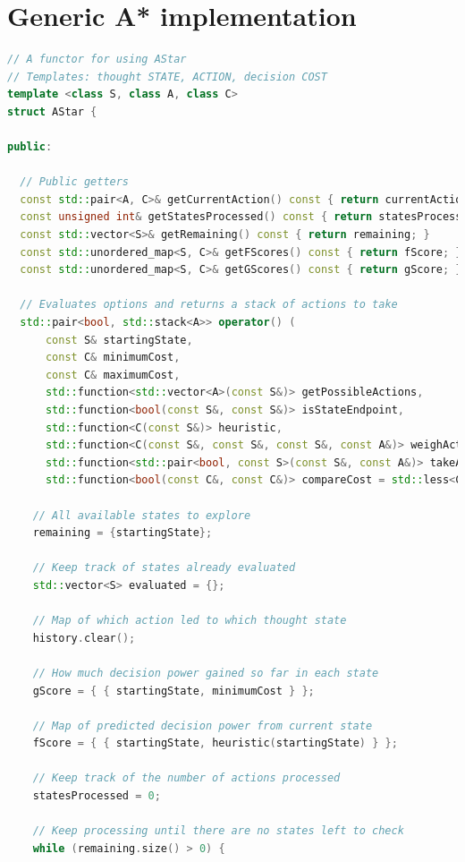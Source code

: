 \documentclass[11pt, a4paper]{report}
\begin{document}
\begin{appendices}
\begin{description}
\end{description}

\chapter{Generic A* implementation}
\label{appendix:genericAStarImplementation}

\linespread{0.8}
\begin{lstlisting}[language=C++]
// A functor for using AStar
// Templates: thought STATE, ACTION, decision COST
template <class S, class A, class C>
struct AStar {

public:

  // Public getters
  const std::pair<A, C>& getCurrentAction() const { return currentAction; }
  const unsigned int& getStatesProcessed() const { return statesProcessed; }
  const std::vector<S>& getRemaining() const { return remaining; }
  const std::unordered_map<S, C>& getFScores() const { return fScore; }
  const std::unordered_map<S, C>& getGScores() const { return gScore; }

  // Evaluates options and returns a stack of actions to take
  std::pair<bool, std::stack<A>> operator() (
      const S& startingState,
      const C& minimumCost,
      const C& maximumCost,
      std::function<std::vector<A>(const S&)> getPossibleActions,
      std::function<bool(const S&, const S&)> isStateEndpoint,
      std::function<C(const S&)> heuristic,
      std::function<C(const S&, const S&, const S&, const A&)> weighAction,
      std::function<std::pair<bool, const S>(const S&, const A&)> takeAction,
      std::function<bool(const C&, const C&)> compareCost = std::less<C>()) {

    // All available states to explore
    remaining = {startingState};

    // Keep track of states already evaluated
    std::vector<S> evaluated = {};
    
    // Map of which action led to which thought state
    history.clear();

    // How much decision power gained so far in each state
    gScore = { { startingState, minimumCost } };

    // Map of predicted decision power from current state
    fScore = { { startingState, heuristic(startingState) } };

    // Keep track of the number of actions processed
    statesProcessed = 0;

    // Keep processing until there are no states left to check
    while (remaining.size() > 0) {


\end{lstlisting}
\end{appendices}
\end{document}
